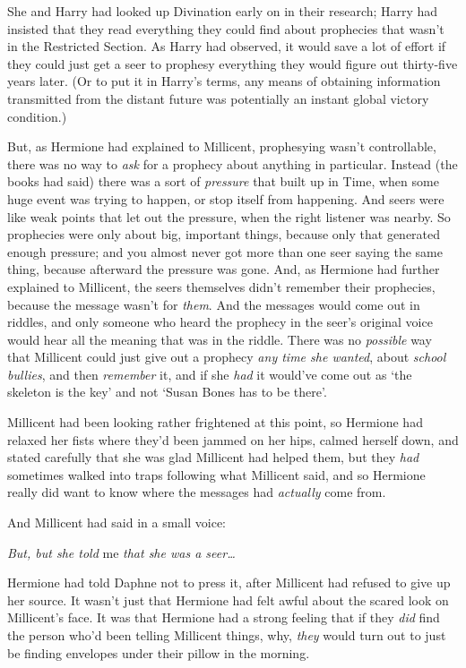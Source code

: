 She and Harry had looked up Divination early on in their research; Harry had 
insisted that they read everything they could find about prophecies that wasn't 
in the Restricted Section. As Harry had observed, it would save a lot of effort 
if they could just get a seer to prophesy everything they would figure out 
thirty-five years later. (Or to put it in Harry's terms, any means of obtaining 
information transmitted from the distant future was potentially an instant 
global victory condition.)

But, as Hermione had explained to Millicent, prophesying wasn't controllable, 
there was no way to \emph{ask} for a prophecy about anything in particular. 
Instead (the books had said) there was a sort of \emph{pressure} that built up 
in Time, when some huge event was trying to happen, or stop itself from 
happening. And seers were like weak points that let out the pressure, when the 
right listener was nearby. So prophecies were only about big, important things, 
because only that generated enough pressure; and you almost never got more than 
one seer saying the same thing, because afterward the pressure was gone. And, 
as Hermione had further explained to Millicent, the seers themselves didn't 
remember their prophecies, because the message wasn't for \emph{them}. And the 
messages would come out in riddles, and only someone who heard the prophecy in 
the seer's original voice would hear all the meaning that was in the riddle. 
There was no \emph{possible} way that Millicent could just give out a prophecy 
\emph{any time she wanted}, about \emph{school bullies}, and then 
\emph{remember} it, and if she \emph{had} it would've come out as `the skeleton 
is the key' and not `Susan Bones has to be there'.

Millicent had been looking rather frightened at this point, so Hermione had 
relaxed her fists where they'd been jammed on her hips, calmed herself down, 
and stated carefully that she was glad Millicent had helped them, but they 
\emph{had} sometimes walked into traps following what Millicent said, and so 
Hermione really did want to know where the messages had \emph{actually} come 
from.

And Millicent had said in a small voice:

\emph{But, but she told} me \emph{that she was a seer{\ldots}}

Hermione had told Daphne not to press it, after Millicent had refused to give 
up her source. It wasn't just that Hermione had felt awful about the scared 
look on Millicent's face. It was that Hermione had a strong feeling that if 
they \emph{did} find the person who'd been telling Millicent things, why, 
\emph{they} would turn out to just be finding envelopes under their pillow in 
the morning.

